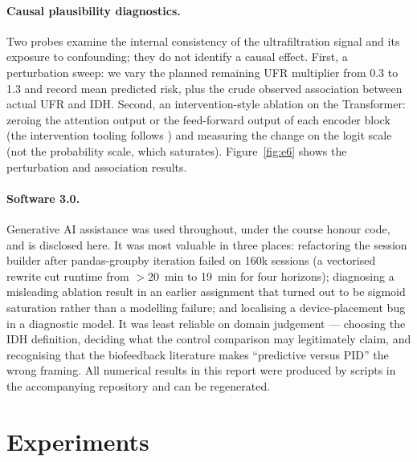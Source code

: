 \documentclass{article}
\begin{document}
\paragraph{Causal plausibility diagnostics.} Two probes examine the internal consistency of the ultrafiltration signal and
its exposure to confounding; they do not identify a causal effect. First, a perturbation sweep: we vary the planned remaining UFR multiplier from 0.3 to 1.3 and record mean predicted risk, plus the crude observed association between actual UFR and IDH. Second, an intervention-style ablation on the Transformer: zeroing the attention output or the feed-forward output of each encoder block (the intervention tooling follows \citealp{wu2024pyvene}) and measuring the change on the logit scale (not the probability scale, which saturates). Figure~\ref{fig:e6} shows the perturbation and association results.

\paragraph{Software 3.0.} Generative AI assistance was used throughout, under the course honour code, and is disclosed here. It was most valuable in three places: refactoring the session builder after pandas-groupby iteration failed on 160k sessions (a vectorised rewrite cut runtime from $>$20~min to 19~min for four horizons); diagnosing a misleading ablation result in an earlier assignment that turned out to be sigmoid saturation rather than a modelling failure; and localising a device-placement bug in a diagnostic model. It was least reliable on domain judgement --- choosing the IDH definition, deciding what the control comparison may legitimately claim, and recognising that the biofeedback literature makes ``predictive versus PID'' the wrong framing. All numerical results in this report were produced by scripts in the accompanying repository and can be regenerated.

\section{Experiments}
\end{document}
